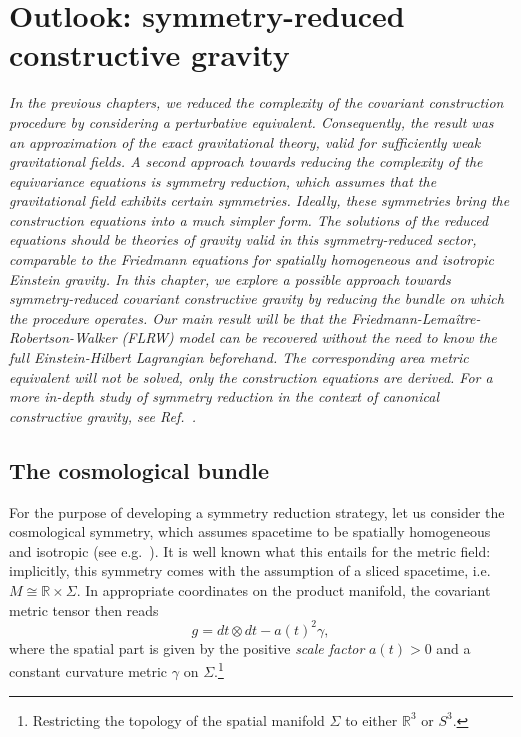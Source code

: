 \chapter{Outlook: symmetry-reduced constructive gravity}\label{chapter_cosmo}

\textit{In the previous chapters, we reduced the complexity of the covariant construction procedure by considering a perturbative equivalent. Consequently, the result was an approximation of the exact gravitational theory, valid for sufficiently weak gravitational fields. A second approach towards reducing the complexity of the equivariance equations is symmetry reduction, which assumes that the gravitational field exhibits certain symmetries. Ideally, these symmetries bring the construction equations into a much simpler form. The solutions of the reduced equations should be theories of gravity valid in this symmetry-reduced sector, comparable to the Friedmann equations for spatially homogeneous and isotropic Einstein gravity. In this chapter, we explore a possible approach towards symmetry-reduced covariant constructive gravity by reducing the bundle on which the procedure operates. Our main result will be that the Friedmann-Lema\^itre-Robertson-Walker (FLRW) model can be recovered without the need to know the full Einstein-Hilbert Lagrangian beforehand. The corresponding area metric equivalent will not be solved, only the construction equations are derived. For a more in-depth study of symmetry reduction in the context of canonical constructive gravity, see Ref.~\cite{Duell_2020}.}

\section{The cosmological bundle}
For the purpose of developing a symmetry reduction strategy, let us consider the cosmological symmetry, which assumes spacetime to be spatially homogeneous and isotropic (see e.g.~\cite{Weinberg_1972,Wald_1984}). It is well known what this entails for the metric field: implicitly, this symmetry comes with the assumption of a sliced spacetime, i.e.\ $M \cong \mathbb R \times \Sigma$. In appropriate coordinates on the product manifold, the covariant metric tensor then reads \cite{Weinberg_1972,Katanaev_2016}
\begin{equation}
  g = dt \otimes dt - a(t)^2 \gamma,
\end{equation}
where the spatial part is given by the positive \emph{scale factor} $a(t) > 0$ and a constant curvature metric $\gamma$ on $\Sigma$.\footnote{Restricting the topology of the spatial manifold $\Sigma$ to either $\mathbb R^3$ or $S^3$.}


